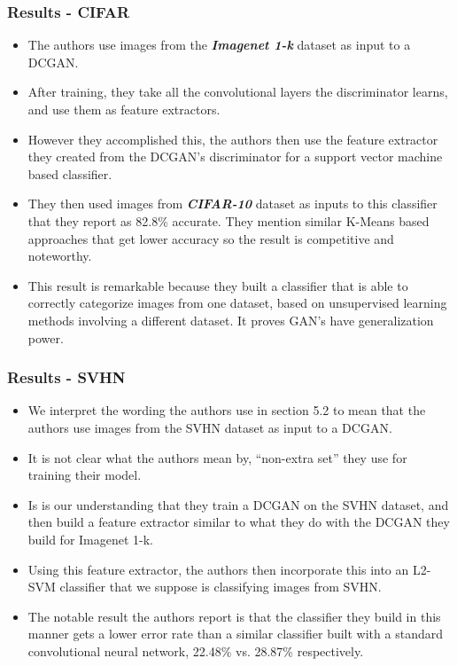 \documentclass{beamer}
\begin{document}
\begin{frame}[allowframebreaks]
\frametitle{Results - CIFAR}
\begin{itemize}
 \item The authors use images from the \textbf{\textit{Imagenet 1-k}} dataset as input to a DCGAN.
 \item After training, they take all the convolutional layers the discriminator
 learns, and use them as feature extractors. 
 
\item However they accomplished this, the authors then use the feature extractor 
  they created from the DCGAN's discriminator for a support vector machine based
  classifier.
\item They then used images from \textbf{\textit{CIFAR-10}} dataset as inputs to this
  classifier that they report as 82.8\% accurate. They mention similar K-Means based
  approaches that get lower accuracy so the result is competitive and noteworthy.
 
\item This result is remarkable because they built a classifier that is able to
  correctly categorize images from one dataset, based on unsupervised learning
  methods involving a different dataset.  It proves GAN's have generalization power.


\end{itemize}
\end{frame}


\begin{frame}[allowframebreaks]
\frametitle{Results - SVHN}
\begin{itemize}
 \item We interpret the wording the authors use in section 5.2 to mean that the
   authors use images from the SVHN dataset as input to a DCGAN.
 \item It is not clear what the authors mean by, ``non-extra set'' they use 
  for training their model.
 \item Is is our understanding that they train a DCGAN on the SVHN dataset, and
  then build a feature extractor similar to what they do with the DCGAN they
  build for Imagenet 1-k.
\item Using this feature extractor, the authors then incorporate this into an
  L2-SVM classifier that we suppose is classifying images from SVHN.
\item The notable result the authors report is that the classifier they build in
  this manner gets a lower error rate than a similar classifier built with a
  standard convolutional neural network, 22.48\% vs. 28.87\% respectively.

\end{itemize}
\end{frame}
\end{document}
